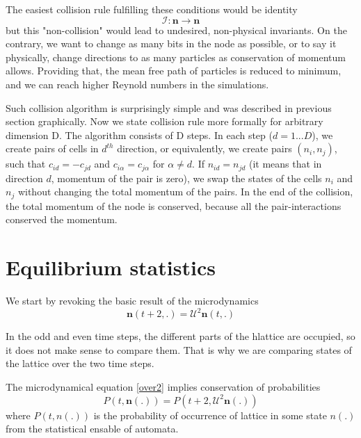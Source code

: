 The easiest collision rule fulfilling these conditions would be identity
\begin{equation}
\mathcal{I}:\bm{n} \rightarrow \bm{n}
\end{equation}
but this "non-collision" would lead to undesired, non-physical invariants.
On the contrary, we want to change as many bits in the node as possible,
or to say it physically, change directions to as many particles as conservation of momentum allows.
Providing that, the mean free path of particles is reduced to minimum, and we can reach higher Reynold numbers in the simulations.

Such collision algorithm is surprisingly simple and was described in previous section graphically.
Now we state collision rule more formally for arbitrary dimension D.
The algorithm consists of D steps.
In each step ($d=1...D$), we create pairs of cells in $d^{th}$ direction, or equivalently, we create pairs $(n_i,n_j)$, such that $c_{id} = -c_{jd}$ and $c_{i\alpha} = c_{j\alpha}$ for $\alpha \neq d$.
If $n_{id} = n_{jd}$ (it means that in direction $d$, momentum of the pair is zero), we swap the states of the cells $n_i$ and $n_j$ without changing the total momentum of the pairs.
In the end of the collision, the total momentum of the node is conserved, because all the pair-interactions conserved the momentum.

\bigskip


\section{Equilibrium statistics}
We start by revoking the basic result of the microdynamics
\begin{equation} \label{over2}
\bm{n}(t+2,.) = \mathcal{U}^2 \bm{n}(t,.)
\end{equation}

In the odd and even time steps, the different parts of the hlattice are occupied, so it does not make sense to compare them.
That is why we are comparing states of the lattice over the two time steps.

The microdynamical equation \ref{over2} implies conservation of probabilities
\begin{equation} \label{cp}
P(t,\bm{n}(.)) = P(t+2,\mathcal{U}^2\bm{n}(.))
\end{equation}
where $P(t,n(.))$ is the probability of occurrence of lattice in some state $n(.)$ from the statistical ensable of automata.

